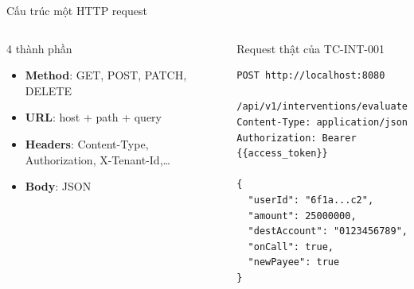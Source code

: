 \documentclass[aspectratio=169,12pt]{beamer}
\begin{document}
\begin{frame}[fragile]{Cấu trúc một HTTP request}
  \begin{columns}[T]
    \begin{block}{4 thành phần}
      \begin{itemize}
        \item \textbf{Method}: GET, POST, PATCH, DELETE
        \item \textbf{URL}: host + path + query
        \item \textbf{Headers}: Content-Type, Authorization, X-Tenant-Id,\dots
        \item \textbf{Body}: JSON
      \end{itemize}
    \end{block}

    \begin{exampleblock}{Request thật của TC-INT-001}
\begin{lstlisting}[language={}]
POST http://localhost:8080
     /api/v1/interventions/evaluate
Content-Type: application/json
Authorization: Bearer {{access_token}}

{
  "userId": "6f1a...c2",
  "amount": 25000000,
  "destAccount": "0123456789",
  "onCall": true,
  "newPayee": true
}
\end{lstlisting}
    \end{exampleblock}
  \end{columns}
\end{frame}
\end{document}

